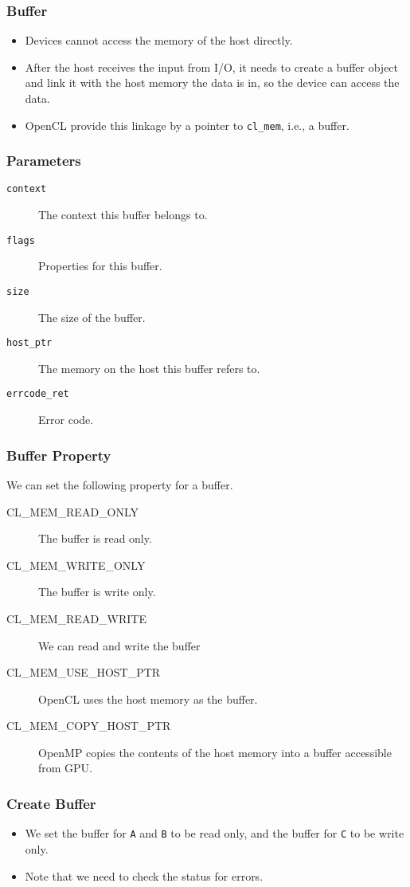 \documentclass{beamer}
\begin{document}
\begin{frame}
  \frametitle{Buffer}
  \begin{itemize}
  \item Devices cannot access the memory of the host directly.
  \item After the host receives the input from I/O, it needs to
    create a buffer object and link it with the host memory the data
    is in, so the device can access the data.  
  \item OpenCL provide this linkage by a pointer to {\tt cl\_mem},
    i.e., a buffer.
  \end{itemize}
\end{frame}

\begin{frame}
\end{frame}

\begin{frame}
  \frametitle{Parameters}
  \begin{description}
  \item [\tt context] The context this buffer belongs to.
  \item [\tt flags] Properties for this buffer.
  \item [\tt size] The size of the buffer.
  \item [\tt host\_ptr] The memory on the host this buffer refers to.
  \item [\tt errcode\_ret] Error code.
  \end{description}
\end{frame}

\begin{frame}
  \frametitle{Buffer Property}
  We can set the following property for a buffer.
  \begin{description}
  \item[CL\_MEM\_READ\_ONLY] The buffer is read only.
  \item[CL\_MEM\_WRITE\_ONLY] The buffer is write only.
  \item[CL\_MEM\_READ\_WRITE] We can read and write the buffer
  \item[CL\_MEM\_USE\_HOST\_PTR] OpenCL uses the host memory as the buffer.
  \item[CL\_MEM\_COPY\_HOST\_PTR] OpenMP copies the contents of the
    host memory into a buffer accessible from GPU.
  \end{description}
\end{frame}

\begin{frame}
  \frametitle{Create Buffer}
  \begin{itemize}
  \item We set the buffer for {\tt A} and {\tt B} to be read only,
    and the buffer for {\tt C} to be write only.
  \item Note that we need to check the status for errors.
  \end{itemize}
\end{frame}
\end{document}
